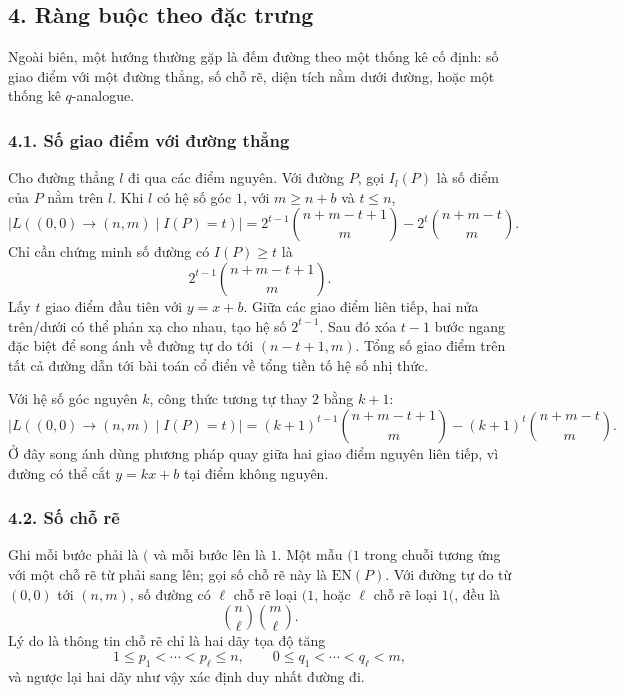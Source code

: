 \documentclass[11pt]{article}
\begin{document}

\subsection*{4. Ràng buộc theo đặc trưng}

Ngoài biên, một hướng thường gặp là đếm đường theo một thống kê cố định: số
giao điểm với một đường thẳng, số chỗ rẽ, diện tích nằm dưới đường, hoặc một
thống kê \(q\)-analogue.

\subsubsection*{4.1. Số giao điểm với đường thẳng}

Cho đường thẳng \(l\) đi qua các điểm nguyên. Với đường \(P\), gọi \(I_l(P)\)
là số điểm của \(P\) nằm trên \(l\). Khi \(l\) có hệ số góc \(1\), với
\(m\ge n+b\) và \(t\le n\),
\[
  |L((0,0)\to(n,m)\mid I(P)=t)|
  =
  2^{t-1}\binom{n+m-t+1}{m}
  -
  2^t\binom{n+m-t}{m}.
\]
Chỉ cần chứng minh số đường có \(I(P)\ge t\) là
\[
  2^{t-1}\binom{n+m-t+1}{m}.
\]
Lấy \(t\) giao điểm đầu tiên với \(y=x+b\). Giữa các giao điểm liên tiếp, hai
nửa trên/dưới có thể phản xạ cho nhau, tạo hệ số \(2^{t-1}\). Sau đó xóa
\(t-1\) bước ngang đặc biệt để song ánh về đường tự do tới
\((n-t+1,m)\). Tổng số giao điểm trên tất cả đường dẫn tới bài toán cổ điển về
tổng tiền tố hệ số nhị thức.


Với hệ số góc nguyên \(k\), công thức tương tự thay \(2\) bằng \(k+1\):
\[
  |L((0,0)\to(n,m)\mid I(P)=t)|
  =
  (k+1)^{t-1}\binom{n+m-t+1}{m}
  -
  (k+1)^t\binom{n+m-t}{m}.
\]
Ở đây song ánh dùng phương pháp quay giữa hai giao điểm nguyên liên tiếp, vì
đường có thể cắt \(y=kx+b\) tại điểm không nguyên.

\subsubsection*{4.2. Số chỗ rẽ}

Ghi mỗi bước phải là \((\) và mỗi bước lên là \(1\). Một mẫu \((1\) trong
chuỗi tương ứng với một chỗ rẽ từ phải sang lên; gọi số chỗ rẽ này là
\(\mathrm{EN}(P)\). Với đường tự do từ \((0,0)\) tới \((n,m)\), số đường có
\(\ell\) chỗ rẽ loại \((1\), hoặc \(\ell\) chỗ rẽ loại \(1(\), đều là
\[
  \binom n\ell\binom m\ell.
\]
Lý do là thông tin chỗ rẽ chỉ là hai dãy tọa độ tăng
\[
  1\le p_1<\cdots<p_\ell\le n,\qquad
  0\le q_1<\cdots<q_\ell<m,
\]
và ngược lại hai dãy như vậy xác định duy nhất đường đi.
\end{document}
